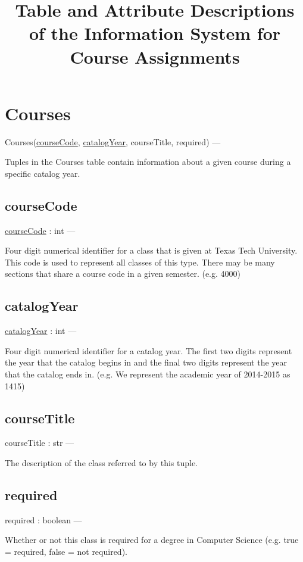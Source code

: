 \documentclass[10pt]{article}
\title{\textbf{\huge Table and Attribute Descriptions of the Information System for Course Assignments}}
\author{\makebox[\linewidth][c]{Diego Lazo\tab Ben Albot\tab Rex Keen\tab Eric Sanchez\tab Tara Parker}}
\date{}
\begin{document}
\maketitle

\newpage
\tableofcontents

\newpage

\section{Courses}
	Courses(\underline{courseCode}, \underline{catalogYear}, courseTitle, required) --- 
	
		Tuples in the Courses table contain information about a given course during a specific catalog year.

	\subsection{courseCode}
		\underline{courseCode} : int ---
		
		Four digit numerical identifier for a class that is given at Texas Tech University. This code is used to represent all classes of this type. There may be many sections that share a course code in a given semester. (e.g. 4000)	
		
	\subsection{catalogYear}
		\underline{catalogYear} : int --- 
		
		Four digit numerical identifier for a catalog year. The first two digits represent the year that the catalog begins in and the final two digits represent the year that the catalog ends in. (e.g. We represent the academic year of 2014-2015 as 1415)
		
	\subsection{courseTitle}	
		courseTitle : str ---
		
		The description of the class referred to by this tuple.
		
	\subsection{required}
		required : boolean ---
		
		Whether or not this class is required for a degree in Computer Science (e.g. true = required, false = not required).
	
\end{document}
